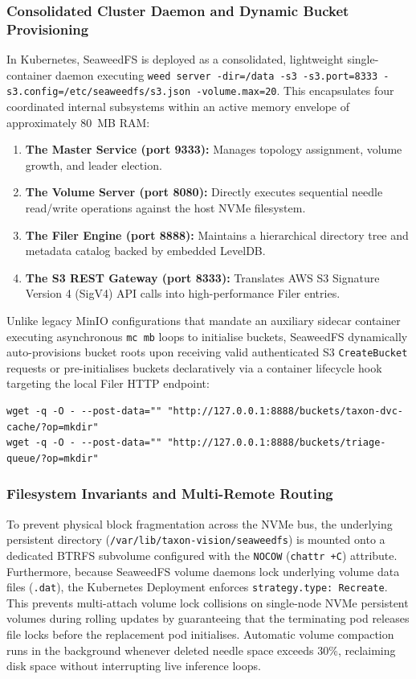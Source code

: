 \subsubsection{Consolidated Cluster Daemon and Dynamic Bucket Provisioning}
In Kubernetes, SeaweedFS is deployed as a consolidated, lightweight single-container daemon executing \texttt{weed server -dir=/data -s3 -s3.port=8333 -s3.config=/etc/seaweedfs/s3.json -volume.max=20}. This encapsulates four coordinated internal subsystems within an active memory envelope of approximately 80~MB RAM:
\begin{enumerate}
    \item \textbf{The Master Service (port 9333):} Manages topology assignment, volume growth, and leader election.
    \item \textbf{The Volume Server (port 8080):} Directly executes sequential needle read/write operations against the host NVMe filesystem.
    \item \textbf{The Filer Engine (port 8888):} Maintains a hierarchical directory tree and metadata catalog backed by embedded LevelDB.
    \item \textbf{The S3 REST Gateway (port 8333):} Translates AWS S3 Signature Version 4 (SigV4) API calls into high-performance Filer entries.
\end{enumerate}

Unlike legacy MinIO configurations that mandate an auxiliary sidecar container executing asynchronous \texttt{mc mb} loops to initialise buckets, SeaweedFS dynamically auto-provisions bucket roots upon receiving valid authenticated S3 \texttt{CreateBucket} requests or pre-initialises buckets declaratively via a container lifecycle hook targeting the local Filer HTTP endpoint:
\begin{verbatim}
wget -q -O - --post-data="" "http://127.0.0.1:8888/buckets/taxon-dvc-cache/?op=mkdir"
wget -q -O - --post-data="" "http://127.0.0.1:8888/buckets/triage-queue/?op=mkdir"
\end{verbatim}

\subsubsection{Filesystem Invariants and Multi-Remote Routing}
To prevent physical block fragmentation across the NVMe bus, the underlying persistent directory (\texttt{/var/lib/taxon-vision/seaweedfs}) is mounted onto a dedicated BTRFS subvolume configured with the \texttt{NOCOW} (\texttt{chattr +C}) attribute. Furthermore, because SeaweedFS volume daemons lock underlying volume data files (\texttt{.dat}), the Kubernetes Deployment enforces \texttt{strategy.type: Recreate}. This prevents multi-attach volume lock collisions on single-node NVMe persistent volumes during rolling updates by guaranteeing that the terminating pod releases file locks before the replacement pod initialises. Automatic volume compaction runs in the background whenever deleted needle space exceeds 30\%, reclaiming disk space without interrupting live inference loops.

